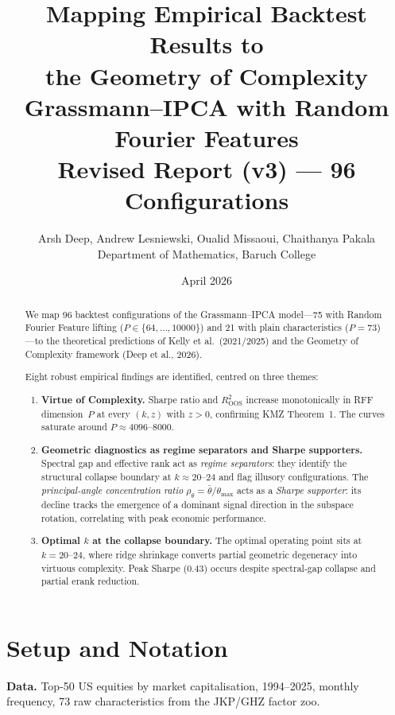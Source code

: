 \documentclass[11pt,a4paper]{article}
\title{%
  \textbf{Mapping Empirical Backtest Results to\\[3pt]
  the Geometry of Complexity}\\[8pt]
  \large Grassmann--IPCA with Random Fourier Features\\[4pt]
  \normalsize Revised Report (v3) --- 96 Configurations
}
\author{%
  Arsh Deep, Andrew Lesniewski, Oualid Missaoui, Chaithanya Pakala\\
  \small Department of Mathematics, Baruch College
}
\date{April 2026}
\begin{document}
\maketitle

\begin{abstract}
We map 96 backtest configurations of the Grassmann--IPCA model---75 with Random Fourier Feature lifting ($P \in \{64, \ldots, 10000\}$) and 21 with plain characteristics ($P = 73$)---to the theoretical predictions of Kelly et al.\ (2021/2025) and the Geometry of Complexity framework (Deep et al., 2026).

Eight robust empirical findings are identified, centred on three themes:
\begin{enumerate}[nosep]
  \item \textbf{Virtue of Complexity.}  Sharpe ratio and $R^2_{\mathrm{OOS}}$ increase monotonically in RFF dimension~$P$ at every $(k, z)$ with $z > 0$, confirming KMZ Theorem~1.  The curves saturate around $P \approx 4096$--$8000$.
  \item \textbf{Geometric diagnostics as regime separators and Sharpe supporters.}  Spectral gap and effective rank act as \emph{regime separators}: they identify the structural collapse boundary at $k \approx 20$--$24$ and flag illusory configurations.  The \emph{principal-angle concentration ratio} $\rho_\theta = \bar\theta / \theta_{\max}$ acts as a \emph{Sharpe supporter}: its decline tracks the emergence of a dominant signal direction in the subspace rotation, correlating with peak economic performance.
  \item \textbf{Optimal $k$ at the collapse boundary.}  The optimal operating point sits at $k = 20$--$24$, where ridge shrinkage converts partial geometric degeneracy into virtuous complexity.  Peak Sharpe ($0.43$) occurs despite spectral-gap collapse and partial erank reduction.
\end{enumerate}
\end{abstract}

\tableofcontents
\newpage


\section{Setup and Notation}
\label{sec:setup}

\noindent\textbf{Data.}  Top-50 US equities by market capitalisation, 1994--2025, monthly frequency, 73 raw characteristics from the JKP/GHZ factor zoo.
\end{document}

